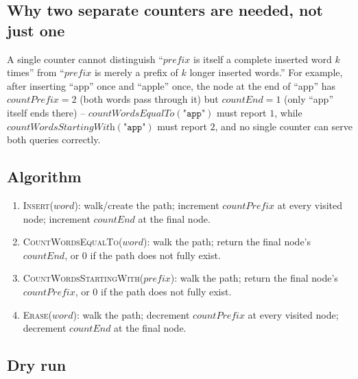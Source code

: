 \subsection*{Why two separate counters are needed, not just one}

A single counter cannot distinguish ``$\textit{prefix}$ is itself a
complete inserted word $k$ times'' from ``$\textit{prefix}$ is merely a
prefix of $k$ longer inserted words.'' For example, after inserting
``app'' once and ``apple'' once, the node at the end of ``app'' has
$\textit{countPrefix}=2$ (both words pass through it) but
$\textit{countEnd}=1$ (only ``app'' itself ends there) --
$\textit{countWordsEqualTo}(\texttt{"app"})$ must report $1$, while
$\textit{countWordsStartingWith}(\texttt{"app"})$ must report $2$, and
no single counter can serve both queries correctly.

\subsection*{Algorithm}

\begin{enumerate}
  \item \textsc{Insert}($word$): walk/create the path; increment
        $\textit{countPrefix}$ at every visited node; increment
        $\textit{countEnd}$ at the final node.
  \item \textsc{CountWordsEqualTo}($word$): walk the path; return the
        final node's $\textit{countEnd}$, or $0$ if the path does not
        fully exist.
  \item \textsc{CountWordsStartingWith}($prefix$): walk the path; return
        the final node's $\textit{countPrefix}$, or $0$ if the path does
        not fully exist.
  \item \textsc{Erase}($word$): walk the path; decrement
        $\textit{countPrefix}$ at every visited node; decrement
        $\textit{countEnd}$ at the final node.
\end{enumerate}

\subsection*{Dry run}



